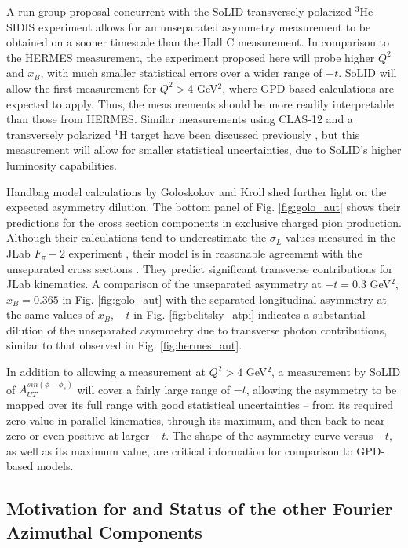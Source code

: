 A run-group proposal concurrent with the SoLID transversely polarized $^3$He
SIDIS experiment allows for an unseparated asymmetry measurement to be obtained
on a sooner timescale than the Hall C measurement.  In comparison to the HERMES
measurement, the experiment proposed here will probe higher $Q^2$ and $x_B$,
with much smaller statistical errors over a wider range of $-t$.
SoLID will allow the first measurement for $Q^2>4$ GeV$^2$, where GPD-based
calculations are expected to apply.  Thus, the measurements should be more
readily interpretable than those from HERMES.  Similar measurements using
CLAS-12 and a transversely polarized $^1$H target have been discussed
previously \cite{clas}, but this measurement will allow for smaller statistical
uncertainties, due to SoLID's higher luminosity capabilities.

Handbag model calculations by Goloskokov and Kroll \cite{GoPC} shed further
light on the expected asymmetry dilution.  The bottom panel of
Fig. \ref{fig:golo_aut} shows their predictions for the cross section
components in exclusive charged pion production.  Although their calculations
tend to underestimate the $\sigma_L$ values measured in the JLab $F_{\pi}-2$
experiment \cite{Fpi2}, their model is in reasonable agreement with the
unseparated cross sections \cite{Go10}.  They predict significant transverse
contributions for JLab kinematics.  A comparison of the unseparated asymmetry
at $-t=0.3$ GeV$^2$, $x_B=0.365$ in Fig. \ref{fig:golo_aut} with the separated
longitudinal asymmetry at the same values of $x_B$, $-t$ in
Fig. \ref{fig:belitsky_atpi} indicates a substantial dilution of the
unseparated asymmetry due to transverse photon contributions, similar to that
observed in Fig. \ref{fig:hermes_aut}.

In addition to allowing a measurement at $Q^2>4$ GeV$^2$, a measurement by
SoLID of $A_{UT}^{sin(\phi-\phi_s)}$ will cover a fairly large range of $-t$,
allowing the asymmetry to be mapped over its full range with good statistical
uncertainties -- from its required zero-value in parallel kinematics, through
its maximum, and then back to near-zero or even positive at larger $-t$.  
The shape of the asymmetry curve versus
$-t$, as well as its maximum value, are critical information for comparison to
GPD-based models.

\subsection{Motivation for and Status of the other Fourier Azimuthal Components}

